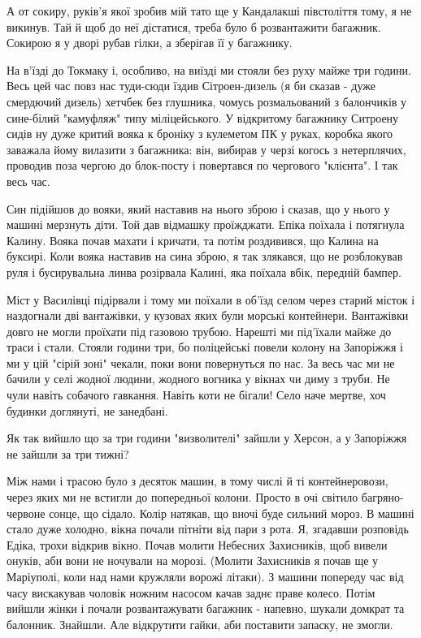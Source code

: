 А от сокиру, руків'я якої зробив мій тато ще у Кандалакші  півстоліття тому, я
не викинув. Тай й щоб до неї дістатися, треба було б розвантажити багажник.
Сокирою я у дворі рубав гілки, а зберігав її у багажнику.

На в'їзді до Токмаку і, особливо,  на виїзді ми стояли без руху майже три
години. Весь цей час повз нас туди-сюди їздив Сітроен-дизель (я би сказав -
дуже смердючий дизель) хетчбек без глушника, чомусь розмальований з балончиків
у сине-білий "камуфляж" типу міліцейського. У відкритому багажнику Ситроену
сидів ну дуже критий вояка к броніку з кулеметом ПК у руках, коробка якого
заважала йому вилазити з багажника: він, вибирав у черзі когось з нетерплячих,
проводив поза чергою до блок-посту і повертався по чергового "клієнта". І так
весь час.

Син підійшов до вояки, який наставив на нього зброю і сказав, що у нього у
машині мерзнуть діти. Той дав відмашку проїжджати. Епіка поїхала і потягнула
Калину. Вояка почав махати і кричати, та потім роздивився, що Калина на
буксирі. Коли вояка наставив на сина зброю, я так злякався, що не розблокував
руля і бусирувальна линва розірвала Калині, яка поїхала вбік, передній бампер.

Міст у Василівці підірвали і тому ми поїхали в об'їзд селом через старий місток
і наздогнали дві вантажівки, у кузовах яких були морські контейнери. Вантажівки
довго не могли проїхати під газовою трубою. Нарешті ми під'їхали майже до траси
і стали. Стояли години три, бо поліцейські  повели колону на Запоріжжя і ми у
цій "сірій зоні" чекали, поки вони повернуться по нас. За весь час ми не бачили
у селі жодної людини, жодного вогника у вікнах чи диму з труби. Не чули навіть
собачого гавкання. Навіть коти не бігали! Село наче мертве, хоч будинки
доглянуті, не занедбані.

Як так вийшло що за три години "визволителі" зайшли у Херсон, а у Запоріжжя не
зайшли за три тижні?

Між нами і трасою було з десяток машин, в тому числі й ті контейнеровози, через
яких ми не встигли до попередньої колони. Просто в очі світило багряно-червоне
сонце, що сідало. Колір натякав, що вночі буде сильний мороз. В машині стало
дуже холодно, вікна почали пітніти від пари з рота. Я, згадавши розповідь
Едіка, трохи відкрив вікно. Почав молити Небесних Захисників, щоб вивели
онуків, аби вони не ночували на морозі. (Молити Захисників я почав ще у
Маріуполі, коли над нами кружляли ворожі літаки). З машини попереду час від
часу вискакував чоловік ножним насосом качав заднє праве колесо. Потім вийшли
жінки і почали розвантажувати багажник - напевно, шукали домкрат та балонник.
Знайшли. Але відкрутити гайки, аби поставити запаску, не змогли. 

